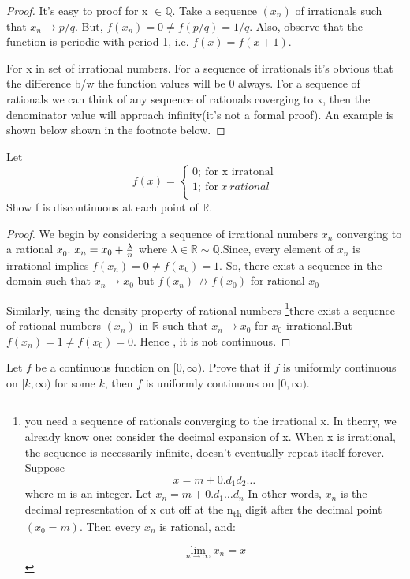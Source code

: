 \documentclass{notes}
\begin{document}
\begin{proof}
	It's easy to proof for x $\in \mathbb{Q}$. Take a sequence $(x_n)$ of irrationals such that $x_n \to p/q$. But, $f(x_n) = 0 \not = f(p/q) = 1/q$. Also, observe that the function is periodic with period 1, i.e. $f(x) = f(x+1)$.
	
	For x in set of irrational numbers. For a sequence of irrationals it's obvious that the difference b/w the function values will be 0 always.
	For a sequence of rationals we can think  of any sequence of rationals coverging to x, then the denominator value will approach infinity(it's not a formal proof). An example is shown below shown in the footnote below.
\end{proof}

\begin{problem} Let 
	$$
	f(x) = \begin{cases} 
	0;\ \text{for x irratonal} \\
	1;\ \text{for}\ x\ {rational }  \\
	\end{cases}
	$$
	Show f is
	discontinuous at each point of $\mathbb{R}$.
\end{problem}
\begin{proof}
	We begin by considering a sequence of irrational numbers $x_n$ converging to a rational $x_0$. $x_n = x_0 + {\lambda \over n}$ where $\lambda \in \mathbb{R \sim Q}$.Since, every element of $x_n$ is irrational implies $f(x_n) = 0 \not= f(x_0) = 1$. So, there exist a sequence in the domain such that $x_n \to x_0$ but $ f(x_n) \not\to  f(x_0)$ for rational $x_0$ 
	
	Similarly, using the density property of rational numbers   \footnote[1]{you need a sequence of rationals converging to the irrational x. In theory, we already know one: consider the decimal expansion of x. When x is irrational, the sequence is necessarily infinite, doesn't eventually repeat itself forever. Suppose
		$$x=m+0.d_1 d_2\ldots$$
		where m is an integer. Let
		$x_n=m+0.d_1\ldots d_n$
		In other words, $x_n$ is the decimal representation of x cut off at the n\textsubscript{th} digit after the decimal point $(x_0=m)$. Then every $x_n$ is rational, and:
		
		$$\lim_{n \to \infty}x_n=x$$ }there exist a sequence of rational numbers $(x_n)$ in $\mathbb{R}$  such that $x_n \to x_0$  for $x_0$ irrational.But $f(x_n) = 1 \not=  f(x_0) = 0$. Hence , it is not continuous. 
\end{proof}
\begin{problem}
	Let $f$ be a continuous function on $[0,\infty)$. Prove that if $f$ is
	uniformly continuous on $[k, \infty)$ for some $k$, then $f$ is uniformly
	continuous on $[0,\infty)$.
\end{problem}
\end{document}
